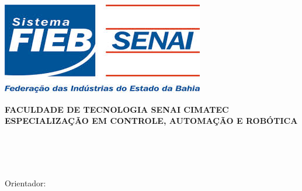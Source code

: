 \documentclass[12pt,oneside,a4paper, chapter=TITLE, section = TITLE, english, brazil]{abntex2}
\begin{document}


\begin{capa}
\begin{center}
	\includegraphics[scale=.5]{imagens/logo_senai} \\
	\begin{large}
		\textbf{FACULDADE DE TECNOLOGIA SENAI CIMATEC \\ 
		ESPECIALIZAÇÃO EM CONTROLE, AUTOMAÇÃO E ROBÓTICA}
 		\vfill %
 		\textbf{\imprimirautor}
 		\vfill %
 		\begin{Large}
 			\textbf{\imprimirtitulo}
 		\end{Large}
  		\vfill
	\end{large}
 
 \imprimirlocal \\
 \imprimirdata

\end{center}  

\newpage

\frenchspacing %
\end{capa}


\begin{folhaderosto}
\begin{center}
	\textbf{\imprimirautor}
	\vfill
	\textbf{\imprimirtitulo}
	\vfill
	\begin{flushright}		
		\begin{minipage}{10cm}
			\imprimirpreambulo			
			\\ 
			\\
			Orientador: \imprimirorientador \\
		\end{minipage}				
	\end{flushright}
	\vfill
	\imprimirlocal \\
	\imprimirdata
\end{center}
\newpage
\end{folhaderosto}
\end{document}
